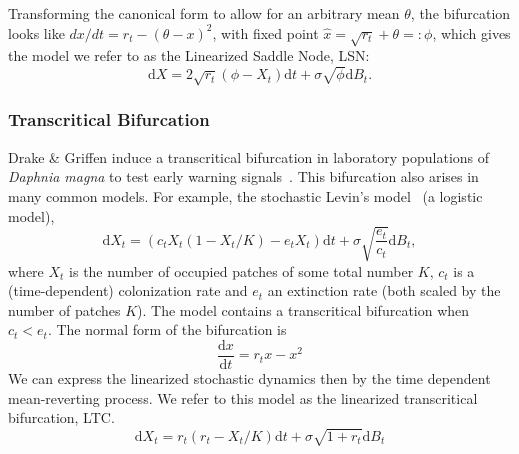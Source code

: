 \documentclass{pnastwo}
\newcommand{\ud}{\mathrm{d}}
\begin{document}
\begin{article}
Transforming the canonical form to allow for an arbitrary mean $\theta$,
the bifurcation looks like $ dx/dt = r_t- (\theta-x)^2 $, with fixed point $\hat x = \sqrt{r_t} +\theta =: \phi$,
which gives the model we refer to as the Linearized Saddle Node, LSN: 
\begin{equation}
\ud X = 2\sqrt{ r_t } (\phi - X_t)\ud t + \sigma\sqrt{\phi } \ud B_t. \label{LSN}
\end{equation}

\subsubsection{Transcritical Bifurcation}
Drake \& Griffen induce a transcritical bifurcation in laboratory populations of \emph{Daphnia magna} to test early warning signals~\cite{Drake2010}.  
This bifurcation also arises in many common models.  For example, the stochastic Levin's model~\cite{Levins1969} (a logistic model),
\begin{equation}
\ud X_t = \left( c_t X_t (1-X_t/K) - e_t X_t \right) \ud t + \sigma \sqrt{\frac{e_t}{c_t}} \ud B_t \label{levins},
\end{equation}
where $X_t$ is the number of occupied patches of some total number $K$, $c_t$ is a (time-dependent)
colonization rate and $e_t$ an extinction rate (both scaled by the number of patches $K$).  
The model contains a transcritical bifurcation when $c_t < e_t$.  The normal form of the bifurcation is
\begin{equation}
\frac{\ud x}{\ud t} = r_t x - x^2 
\label{transcritical}
\end{equation}
We can express the linearized stochastic dynamics then by the time dependent mean-reverting process. 
We refer to this model as the linearized transcritical bifurcation, LTC.  
\begin{equation}
\ud X_t = r_t (r_t - X_t/K) \ud t + \sigma \sqrt{1+r_t} \ud B_t \label{LTC}
\end{equation}


\end{article}
\end{document}
